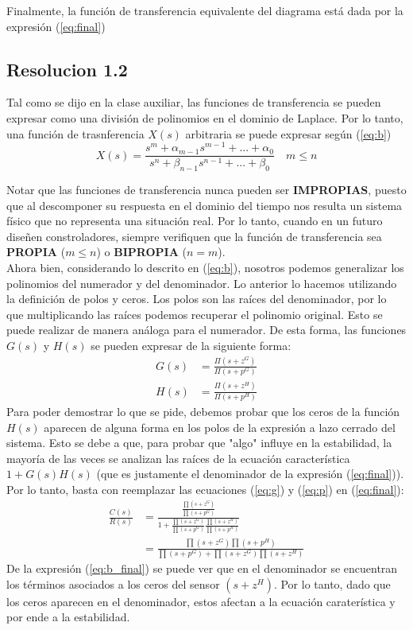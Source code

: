 \documentclass[
  11pt,
  letterpaper,
   addpoints,
   answers
  ]{exam}
\begin{document}
\begin{questions}
\begin{solution}
        Finalmente, la función de transferencia equivalente del diagrama está dada por la expresión (\ref{eq:final})
\subsection*{Resolucion 1.2}
Tal como se dijo en la clase auxiliar, las funciones de transferencia se pueden expresar como una división de polinomios en el dominio de Laplace. Por lo tanto, una función de trasnferencia $X(s)$ arbitraria se puede expresar según (\ref{eq:b})
\begin{equation}
    X(s)=\frac{s^m+\alpha_{m-1} s^{m-1}+...+\alpha_0}{s^n + \beta_{n-1}s^{n-1}+...+\beta_0} \quad m\leq n \label{eq:b}
\end{equation}

Notar que las funciones de transferencia nunca pueden ser \textbf{IMPROPIAS}, puesto que al descomponer su respuesta en el dominio del tiempo nos resulta un sistema físico que no representa una situación real. Por lo tanto, cuando en un futuro diseñen constroladores, siempre verifiquen que la función de transferencia sea \textbf{PROPIA} ($m\leq n$) o \textbf{BIPROPIA} ($n=m$).\\

Ahora bien, considerando lo descrito en (\ref{eq:b}), nosotros podemos generalizar los polinomios del numerador y del denominador. Lo anterior lo hacemos utilizando la definición de polos y ceros. Los polos son las raíces del denominador, por lo que multiplicando las raíces podemos recuperar el polinomio original. Esto se puede realizar de manera análoga para el numerador. De esta forma, las funciones $G(s)$ y $H(s)$ se pueden expresar de la siguiente forma:
\begin{align}
    G(s)&=\frac{\Pi (s+z^{G})}{\Pi (s+p^{G})} \label{eq:g} \\
    H(s)&=\frac{\Pi (s+z^{H})}{\Pi (s+p^{H})} \label{eq:p}
\end{align}
Para poder demostrar lo que se pide, debemos probar que los ceros de la función $H(s)$ aparecen de alguna forma en los polos de la expresión a lazo cerrado del sistema. Esto se debe a que, para probar que "algo" influye en la estabilidad, la mayoría de las veces se analizan las raíces de la ecuación característica $1+G(s)H(s)$ (que es justamente el denominador de la expresión (\ref{eq:final})). Por lo tanto, basta con reemplazar las ecuaciones (\ref{eq:g}) y (\ref{eq:p}) en (\ref{eq:final}):
\begin{align}
    \frac{C(s)}{R(s)} &= \frac{\frac{\prod (s+z^{G})}{\prod (s+p^{G})}}{1 + \frac{\prod (s+z^{G})}{\prod (s+p^{G})}\frac{\prod (s+z^{H})}{\prod (s+p^{H})}} \nonumber \\
    &= \frac{\prod (s+z^{G}) \prod (s+p^{H})}{\prod (s+p^{G}) + \prod (s+z^{G}) \prod (s+z^{H})} \label{eq:b_final}
\end{align}
De la expresión (\ref{eq:b_final}) se puede ver que en el denominador se encuentran los términos asociados a los ceros del sensor $(s+z^H)$. Por lo tanto, dado que los ceros aparecen en el denominador, estos afectan a la ecuación caraterística y por ende a la estabilidad.


\end{solution}
\end{questions}
\end{document}
